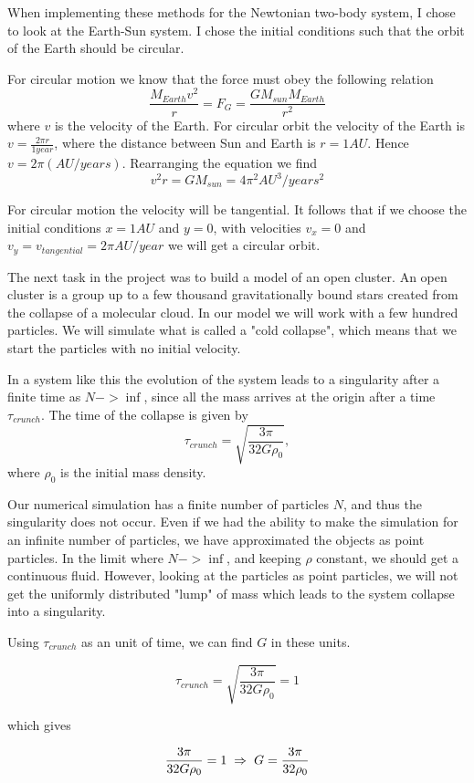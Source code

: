 \documentclass[a4paper,12pt, english]{article}
\begin{document}
When implementing these methods for the Newtonian two-body system, I chose to look at the Earth-Sun system. I chose the initial conditions such that the orbit of the Earth should be circular.

For circular motion we know that the force must obey the following relation 
$$\frac{M_{Earth}v^2}{r} = F_G = \frac{GM_{sun}M_{Earth}}{r^2}$$ where $v$ is the velocity of the Earth. 
For circular orbit the velocity of the Earth is $v = \frac{2 \pi r}{1 year}$, where the distance between Sun and Earth is $r = 1 AU$. Hence $v = 2 \pi (AU/years)$. Rearranging the equation we find
$$v^2r = GM_{sun} = 4 \pi ^2 AU^3/years^2$$

For circular motion the velocity will be tangential. It follows that if we choose the initial conditions $ x = 1 AU $ and $ y = 0$, with velocities $v_x = 0$ and $v_y = v_{tangential} = 2 \pi AU/year$ we will get a circular orbit.    

The next task in the project was to build a model of an open cluster. An open cluster is a group up to a few thousand gravitationally bound stars created from the collapse of a molecular cloud. In our model we will work with a few hundred particles. We will simulate what is called a "cold collapse", which means that we start the particles with no initial velocity. 

In a system like this the evolution of the system leads to a singularity after a finite time as $N -> \inf$, since all the mass arrives at the origin after a time $\tau_{crunch}$. The time of the collapse is given by $$\tau_{crunch} = \sqrt{\frac{3 \pi}{32G \rho_0}},$$ where $\rho_0$ is the initial mass density. 

Our numerical simulation has a finite number of particles $N$, and thus the singularity does not occur. Even if we had the ability to make the simulation for an infinite number of particles, we have approximated the objects as point particles. In the limit where $N -> \inf$, and keeping $\rho$ constant, we should get a continuous fluid. However, looking at the particles as point particles, we will not get the uniformly distributed "lump" of mass which leads to the system collapse into a singularity.     

Using $\tau_{crunch}$ as an unit of time, we can find $G$ in these units. 

\[
\tau_{crunch} = \sqrt{\frac{3 \pi}{32 G \rho_0}} = 1
\]

which gives 

\[
\frac{3 \pi}{32G \rho_0} = 1 \hspace{1mm} \Rightarrow \hspace{1mm} G = \frac{3 \pi}{32 \rho_0}
\]
\end{document}
